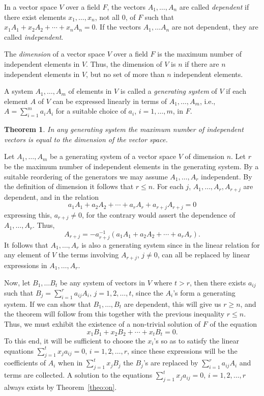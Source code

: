 \documentclass[10pt,leqno]{article}
\newtheorem{theo}{Theorem}
\theoremstyle{definition}
\begin{document}
In a vector space $V$ over a field $F$, the vectors $A_1, \ldots, A_n$ are called \emph{dependent} if there exist elements $x_1, \ldots, x_n$, not all $0$, of $F$ such that $x_1 A_1 + x_2 A_2 + \cdots + x_n A_n = 0$.
If the vectors $A_1, \ldots A_n$ are not dependent, they are called \emph{independent}.

The \emph{dimension} of a vector space $V$ over a field $F$ is the maximum number of independent elements in $V$. Thus, the dimension of $V$ is $n$ if there are $n$ independent elements in $V$, but no set of more than $n$ independent elements.

A system $A_1, \ldots, A_m$ of elements in $V$ is called a \emph{generating system} of $V$ if each element $A$ of $V$ can be expressed linearly in terms of $A_1, \ldots, A_m$, i.e., $A = \sum_{i = 1}^m a_i A_i$ for a suitable choice of $a_i$, $i = 1,\ldots, m$, in $F$.


\begin{theo}
\label{theo:tw}
In any generating system the maximum number of independent vectors is equal to the dimension of the vector space.
\end{theo}

Let $A_1, \ldots, A_m$ be a generating system of a vector space $V$ of dimension $n$.
Let $r$ be the maximum number of independent elements in the generating system.
By a suitable reordering of the generators we may assume $A_1, \dots, A_r$ independent.
By the definition of dimension it follows that $r \leq n$.
For each $j$, $A_1, \ldots, A_r, A_{r+j}$ are dependent, and in the relation
\[
a_1 A_1 + a_2 A_2 + \cdots + a_r A_r + a_{r+j} A_{r+j} = 0
\]
expressing this, $a_{r+j} \not=0$, for the contrary would assert the dependence of $A_1, \ldots, A_r$.
Thus,
\[
A_{r+j} = -a_{r+j}^{-1}(a_1 A_1 + a_2 A_2 + \cdots + a_r A_r).
\]
It follows that $A_1, \ldots, A_r$ is also a generating system since in the linear relation for any element of $V$ the terms involving $A_{r+j}$, $j\not=0$, can all be replaced by linear expressions in $A_1, \ldots, A_r$.

Now, let $B_1, \ldots B_t$ be any system of vectors in $V$ where $t > r$, then there exists $a_{ij}$ such that $B_j = \sum_{i=1}^r a_{ij} A_i$, $j=1,2,\dots,t$, since the $A_i$'s form a generating system.
If we can show that $B_1, \ldots, B_t$ are dependent, this will give us $r \geq n$, and the theorem will follow from this together with the previous inequality $r \leq n$.
Thus, we must exhibit the existence of a non-trivial solution of $F$ of the equation
\[
x_1 B_1 + x_2 B_2 + \cdots + x_t B_t = 0.
\]
To this end, it will be sufficient to choose the $x_i$'s so as to satisfy the linear equations $\sum_{j=1}^t x_j a_{ij} = 0$, $i = 1,2,\dots,r$, since these expressions will be the coefficients of $A_i$ when in $\sum_{j=1}^t x_j B_j$ the $B_j$'s are replaced by $\sum_{i=1}^r a_{ij} A_i$ and terms are collected.
A solution to the equations $\sum_{j=1}^t x_j a_{ij} = 0$, $i = 1,2,\ldots,r$ always exists by Theorem~\ref{theo:on}.
\end{document}
